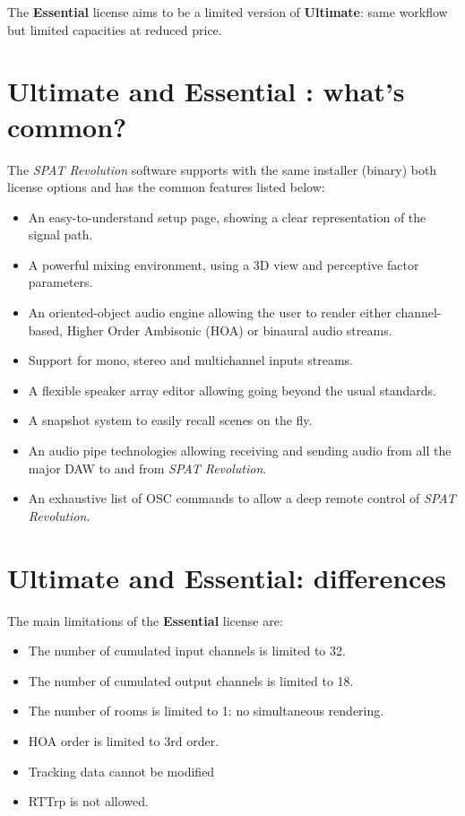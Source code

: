 \documentclass[
  letterpaper,
  DIV=11,
  numbers=noendperiod]{scrreport}
\providecommand{\tightlist}{%
  \setlength{\itemsep}{0pt}\setlength{\parskip}{0pt}}\usepackage{longtable,booktabs,array}
\begin{document}
The \textbf{Essential} license aims to be a limited version of
\textbf{Ultimate}: same workflow but limited capacities at reduced
price.

\hypertarget{ultimate-and-essential-whats-common}{%
\section{Ultimate and Essential : what's
common?}\label{ultimate-and-essential-whats-common}}

The \emph{SPAT Revolution} software supports with the same installer
(binary) both license options and has the common features listed below:

\begin{itemize}
\tightlist
\item
  An easy-to-understand setup page, showing a clear representation of
  the signal path.
\item
  A powerful mixing environment, using a 3D view and perceptive factor
  parameters.
\item
  An oriented-object audio engine allowing the user to render either
  channel-based, Higher Order Ambisonic (HOA) or binaural audio streams.
\item
  Support for mono, stereo and multichannel inputs streams.
\item
  A flexible speaker array editor allowing going beyond the usual
  standards.
\item
  A snapshot system to easily recall scenes on the fly.
\item
  An audio pipe technologies allowing receiving and sending audio from
  all the major DAW to and from \emph{SPAT Revolution}.
\item
  An exhaustive list of OSC commands to allow a deep remote control of
  \emph{SPAT Revolution}.
\end{itemize}

\hypertarget{ultimate-and-essential-differences}{%
\section{Ultimate and Essential:
differences}\label{ultimate-and-essential-differences}}

The main limitations of the \textbf{Essential} license are:

\begin{itemize}
\tightlist
\item
  The number of cumulated input channels is limited to 32.
\item
  The number of cumulated output channels is limited to 18.
\item
  The number of rooms is limited to 1: no simultaneous rendering.
\item
  HOA order is limited to 3rd order.
\item
  Tracking data cannot be modified
\item
  RTTrp is not allowed.
\end{itemize}
\end{document}

